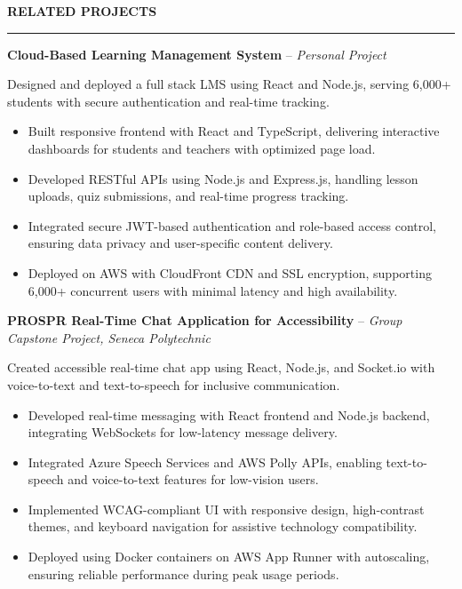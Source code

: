 \documentclass[10pt,letterpaper]{article}
\begin{document}
\vspace{6pt}

\textbf{RELATED PROJECTS}\\[-8pt]
\noindent\rule{\textwidth}{1pt}

\vspace{-2pt}

\textbf{Cloud-Based Learning Management System} -- \emph{Personal Project}

\vspace{-1pt}

Designed and deployed a full stack LMS using React and Node.js, serving 6,000+ students with secure authentication and real-time tracking.
\vspace{-1pt}
\begin{itemize}
\item Built responsive frontend with React and TypeScript, delivering interactive dashboards for students and teachers with optimized page load.
\item Developed RESTful APIs using Node.js and Express.js, handling lesson uploads, quiz submissions, and real-time progress tracking.
\item Integrated secure JWT-based authentication and role-based access control, ensuring data privacy and user-specific content delivery.
\item Deployed on AWS with CloudFront CDN and SSL encryption, supporting 6,000+ concurrent users with minimal latency and high availability.
\end{itemize}

\textbf{PROSPR  Real-Time Chat Application for Accessibility} -- \emph{Group Capstone Project, Seneca Polytechnic}

\vspace{-1pt}

Created accessible real-time chat app using React, Node.js, and Socket.io with voice-to-text and text-to-speech for inclusive communication.
\vspace{-1pt}
\begin{itemize}
\item Developed real-time messaging with React frontend and Node.js backend, integrating WebSockets for low-latency message delivery.
\item Integrated Azure Speech Services and AWS Polly APIs, enabling text-to-speech and voice-to-text features for low-vision users.
\item Implemented WCAG-compliant UI with responsive design, high-contrast themes, and keyboard navigation for assistive technology compatibility.
\item Deployed using Docker containers on AWS App Runner with autoscaling, ensuring reliable performance during peak usage periods.
\end{itemize}
\end{document}
